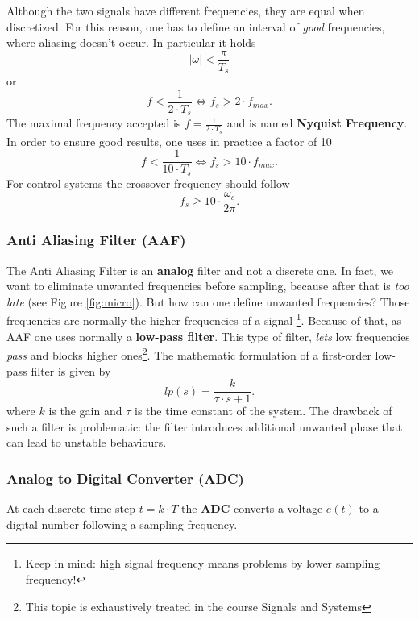 \documentclass[a4paper,12 pt]{article}
\numberwithin{equation}{section}
\theoremstyle{definition}
\theoremstyle{remark}
\theoremstyle{definition}
\theoremstyle{definition}
\theoremstyle{definition}
\theoremstyle{remark}
\begin{document}
Although the two signals have different frequencies, they are equal when discretized. For this reason, one has to define an interval of \textit{good} frequencies, where aliasing doesn't occur. In particular it holds
\begin{equation}
|\omega|<\frac{\pi}{T_s}
\end{equation}
or
\begin{equation}
f<\frac{1}{2\cdot T_s} \Leftrightarrow f_s>2\cdot f_{max}.
\end{equation}
The maximal frequency accepted is $f=\frac{1}{2\cdot T_s}$ and is named \textbf{Nyquist Frequency}. In order to ensure good results, one uses in practice a factor of 10
\begin{equation}
f<\frac{1}{10\cdot T_s} \Leftrightarrow f_s>10\cdot f_{max}.
\end{equation}
For control systems the crossover frequency should follow
\begin{equation}
f_s\geq 10\cdot \frac{\omega_c}{2\pi}.
\end{equation}
\subsubsection*{Anti Aliasing Filter (AAF)}
The Anti Aliasing Filter is an \textbf{analog} filter and not a discrete one. In fact, we want to eliminate unwanted frequencies before sampling, because after that is \textit{too late} (see Figure \ref{fig:micro}). But how can one define unwanted frequencies? Those frequencies are normally the higher frequencies of a signal \footnote{Keep in mind: high signal frequency means problems by lower sampling frequency!}. Because of that, as AAF one uses normally a \textbf{low-pass filter}. This type of filter, \textit{lets} low frequencies \textit{pass} and blocks higher ones\footnote{This topic is exhaustively treated in the course Signals and Systems}. The mathematic formulation of a first-order low-pass filter is given by
\begin{equation}
lp(s)=\frac{k}{\tau\cdot s +1}.
\end{equation}
where $k$ is the gain and $\tau$ is the time constant of the system.
The drawback of such a filter is problematic: the filter introduces additional unwanted phase that can lead to unstable behaviours.


\subsubsection*{Analog to Digital Converter (ADC)}
At each discrete time step $t=k\cdot T$ the \textbf{ADC} converts a voltage $e(t)$ to a digital number following a sampling frequency. 
\end{document}
